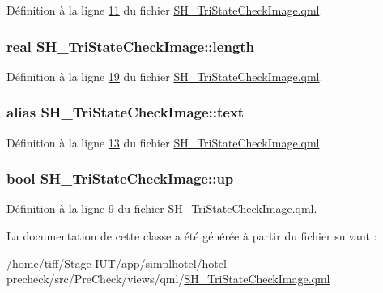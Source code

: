 Définition à la ligne \hyperlink{SH__TriStateCheckImage_8qml_source_l00011}{11} du fichier \hyperlink{SH__TriStateCheckImage_8qml_source}{S\-H\-\_\-\-Tri\-State\-Check\-Image.\-qml}.

\hypertarget{classSH__TriStateCheckImage_aa4fa21a8c9124188a7ea87b4a922c617}{
\subsubsection[{length}]{\setlength{\rightskip}{0pt plus 5cm}real S\-H\-\_\-\-Tri\-State\-Check\-Image\-::length}}\label{classSH__TriStateCheckImage_aa4fa21a8c9124188a7ea87b4a922c617}


Définition à la ligne \hyperlink{SH__TriStateCheckImage_8qml_source_l00019}{19} du fichier \hyperlink{SH__TriStateCheckImage_8qml_source}{S\-H\-\_\-\-Tri\-State\-Check\-Image.\-qml}.

\hypertarget{classSH__TriStateCheckImage_af1e4845c499b61447425538898cf9dbb}{
\subsubsection[{text}]{\setlength{\rightskip}{0pt plus 5cm}alias S\-H\-\_\-\-Tri\-State\-Check\-Image\-::text}}\label{classSH__TriStateCheckImage_af1e4845c499b61447425538898cf9dbb}


Définition à la ligne \hyperlink{SH__TriStateCheckImage_8qml_source_l00013}{13} du fichier \hyperlink{SH__TriStateCheckImage_8qml_source}{S\-H\-\_\-\-Tri\-State\-Check\-Image.\-qml}.

\hypertarget{classSH__TriStateCheckImage_a8a6a37f71149d3f918f642fa9d3e432c}{
\subsubsection[{up}]{\setlength{\rightskip}{0pt plus 5cm}bool S\-H\-\_\-\-Tri\-State\-Check\-Image\-::up}}\label{classSH__TriStateCheckImage_a8a6a37f71149d3f918f642fa9d3e432c}


Définition à la ligne \hyperlink{SH__TriStateCheckImage_8qml_source_l00009}{9} du fichier \hyperlink{SH__TriStateCheckImage_8qml_source}{S\-H\-\_\-\-Tri\-State\-Check\-Image.\-qml}.



La documentation de cette classe a été générée à partir du fichier suivant \-:\begin{DoxyCompactItemize}
\item 
/home/tiff/\-Stage-\/\-I\-U\-T/app/simplhotel/hotel-\/precheck/src/\-Pre\-Check/views/qml/\hyperlink{SH__TriStateCheckImage_8qml}{S\-H\-\_\-\-Tri\-State\-Check\-Image.\-qml}\end{DoxyCompactItemize}
